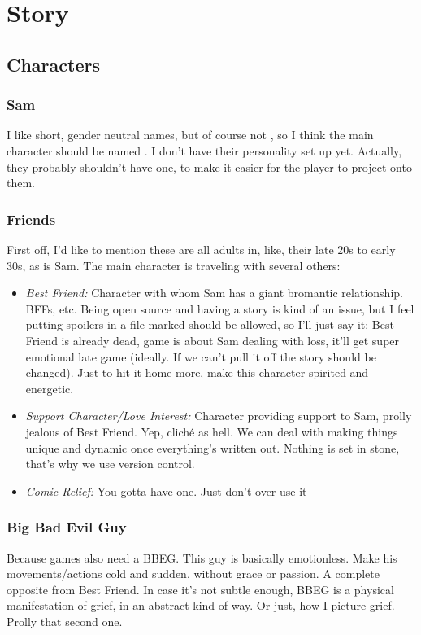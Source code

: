 \documentclass[a4paper,12pt]{article}
\begin{document}
  \tableofcontents

  \section{Story}

  \subsection{Characters}
  \subsubsection*{Sam}
  I like short, gender neutral names, but of course not , so I think the main character should be named . I don't have their personality set up yet. Actually, they probably shouldn't have one, to make it easier for the player to project onto them.

  \subsubsection*{Friends}
  First off, I'd like to mention these are all adults in, like, their late 20s to early 30s, as is Sam. The main character is traveling with several others:
  \begin{itemize}
     \item \emph{Best Friend:} Character with whom Sam has a giant bromantic relationship. BFFs, etc. Being open source and having a story is kind of an issue, but I feel putting spoilers in a file marked  should be allowed, so I'll just say it: Best Friend is already dead, game is about Sam dealing with loss, it'll get super emotional late game (ideally. If we can't pull it off the story should be changed). Just to hit it home more, make this character spirited and energetic.

    \item \emph{Support Character/Love Interest:} Character providing support to Sam, prolly jealous of Best Friend. Yep, clich\'e as hell. We can deal with making things unique and dynamic once everything's written out. Nothing is set in stone, that's why we use version control.

    \item \emph{Comic Relief:} You gotta have one. Just don't over use it
  \end{itemize}

  \subsubsection*{Big Bad Evil Guy}
  Because games also need a BBEG. This guy is basically emotionless. Make his movements/actions cold and sudden, without grace or passion. A complete opposite from Best Friend. In case it's not subtle enough, BBEG is a physical manifestation of grief, in an abstract kind of way. Or just, how I picture grief. Prolly that second one.
\end{document}
